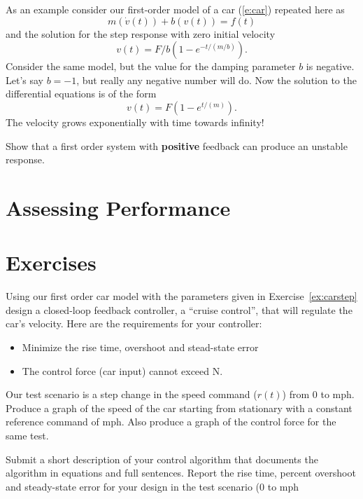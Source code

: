 As an example consider our first-order model of a car (\ref{e:car}) repeated here as
\[
m\left(\dot{v}(t)\right) + b(v(t)) = f(t)
\]
and the solution for the step response with zero initial velocity
\[
v(t) = F/b \left(1-e^{-t/(m/b)} \right).
\]
Consider the same model, but the value for the damping parameter $b$ is negative.  Let's say $b=-1$, but really any negative number will do.  Now the solution to the differential equations is of the form
\[
v(t) = F \left(1-e^{t/(m)} \right).
\]
The velocity grows exponentially with time towards infinity!

\begin{ex}
Show that a first order system with {\bf positive} feedback can produce an unstable response.
\end{ex}

\section{Assessing Performance}



\section{Exercises}
\begin{ex}
Using our first order car model with the parameters given in Exercise~\ref{ex:carstep} design a closed-loop feedback controller, a ``cruise control'', that will regulate the car's velocity.  Here are the requirements for your controller:
\begin{itemize}
\item Minimize the rise time, overshoot and stead-state error
\item The control force (car input) cannot exceed \unit[15,000]{N}.
\end{itemize}

Our test scenario is a step change in the speed command ($r(t)$) from 0 to \unit[60]{mph}. Produce a graph of the speed of the car starting from stationary with a constant reference command of \unit[60]{mph}.  Also produce a graph of the control force for the same test.

Submit a short description of your control algorithm that documents the algorithm in equations and full sentences.  Report the rise time, percent overshoot and steady-state error for your design in the test scenario (0 to \unit[60]{mph}
\end{ex}

